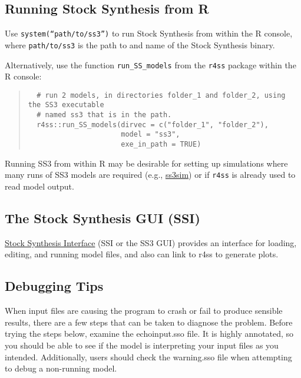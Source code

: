 \subsection{Running Stock Synthesis from R}

Use \texttt{system(“path/to/ss3”)} to run Stock Synthesis from within the R console, where \texttt{path/to/ss3} is the path to and name of the Stock Synthesis binary.

Alternatively, use the function \texttt{run\_SS\_models} from the \texttt{r4ss} package within the R console:

\begin{quote}
  \begin{verbatim}
  # run 2 models, in directories folder_1 and folder_2, using the SS3 executable
  # named ss3 that is in the path.
  r4ss::run_SS_models(dirvec = c("folder_1", "folder_2"),
                      model = "ss3",
                      exe_in_path = TRUE)
  \end{verbatim}
\end{quote}

Running SS3 from within R may be desirable for setting up simulations where many runs of SS3 models are required (e.g., \href{https://github.com/ss3sim/ss3sim}{ss3sim}) or if \texttt{r4ss} is already used to read model output.

\subsection{The Stock Synthesis GUI (SSI)}
\href{https://vlab.noaa.gov/web/stock-synthesis/document-library/-/document_library/0LmuycloZeIt/view/5042951}{Stock Synthesis Interface} (SSI or the SS3 GUI) provides an interface for loading, editing, and running model files, and also can link to r4ss to generate plots.

\subsection{Debugging Tips}
When input files are causing the program to crash or fail to produce sensible results, there are a few steps that can be taken to diagnose the problem.  Before trying the steps below, examine the echoinput.sso file.  It is highly annotated, so you should be able to see if the model is interpreting your input files as you intended.  Additionally, users should check the warning.sso file when attempting to debug a non-running model.

